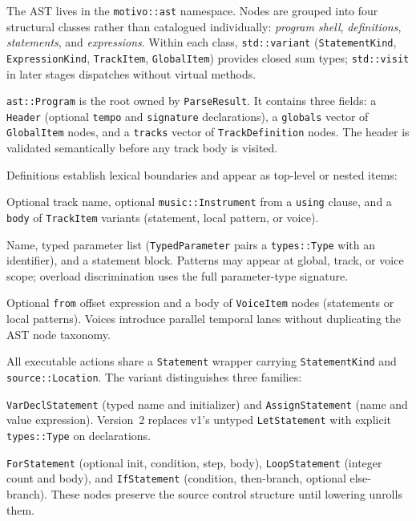 
The AST lives in the \texttt{motivo::ast} namespace.
Nodes are grouped into four structural classes rather than catalogued individually: \emph{program shell},
\emph{definitions}, \emph{statements}, and \emph{expressions}.
Within each class, \texttt{std::variant} (\texttt{StatementKind}, \texttt{ExpressionKind}, \texttt{TrackItem},
\texttt{GlobalItem}) provides closed sum types; \texttt{std::visit} in later stages dispatches without virtual methods.

\texttt{ast::Program} is the root owned by \texttt{ParseResult}.
It contains three fields: a \texttt{Header} (optional \texttt{tempo} and \texttt{signature} declarations), a
\texttt{globals} vector of \texttt{GlobalItem} nodes, and a \texttt{tracks} vector of \texttt{TrackDefinition} nodes.
The header is validated semantically before any track body is visited.

Definitions establish lexical boundaries and appear as top-level or nested items:

 Optional track name, optional \texttt{music::Instrument} from a
\texttt{using} clause, and a \texttt{body} of \texttt{TrackItem} variants (statement, local pattern, or voice).

 Name, typed parameter list (\texttt{TypedParameter} pairs a
\texttt{types::Type} with an identifier), and a statement block.
Patterns may appear at global, track, or voice scope; overload discrimination uses the full parameter-type signature.

 Optional \texttt{from} offset expression and a body of \texttt{VoiceItem}
nodes (statements or local patterns).
Voices introduce parallel temporal lanes without duplicating the AST node taxonomy.

All executable actions share a \texttt{Statement} wrapper carrying \texttt{StatementKind} and \texttt{source::Location}.
The variant distinguishes three families:

 \texttt{VarDeclStatement} (typed name and initializer) and \texttt{AssignStatement}
(name and value expression).
Version~2 replaces v1's untyped \texttt{LetStatement} with explicit \texttt{types::Type} on declarations.

 \texttt{ForStatement} (optional init, condition, step, body), \texttt{LoopStatement}
(integer count and body), and \texttt{IfStatement} (condition, then-branch, optional else-branch).
These nodes preserve the source control structure until lowering unrolls them.

